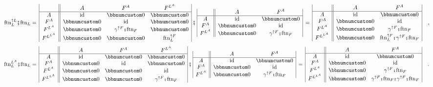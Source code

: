 \[
\negthickspace\negthickspace\negthickspace\negthickspace\text{ftn}_{L}^{\uparrow L}\bef\text{ftn}_{L}=\,\begin{array}{|c||ccc|}
 & A & F^{A} & F^{L^{A}}\\
\hline A & \text{id} & \bbnum 0 & \bbnum 0\\
F^{A} & \bbnum 0 & \text{id} & \bbnum 0\\
F^{L^{A}} & \bbnum 0 & \gamma^{\uparrow F}\bef\text{ftn}_{F} & \bbnum 0\\
F^{L^{L^{A}}} & \bbnum 0 & \bbnum 0 & \text{ftn}_{L}^{\uparrow F}
\end{array}\,\bef\,\begin{array}{|c||cc|}
 & A & F^{A}\\
\hline A & \text{id} & \bbnum 0\\
F^{A} & \bbnum 0 & \text{id}\\
F^{L^{A}} & \bbnum 0 & \gamma^{\uparrow F}\bef\text{ftn}_{F}
\end{array}\,=\,\begin{array}{|c||cc|}
 & A & F^{A}\\
\hline A & \text{id} & \bbnum 0\\
F^{A} & \bbnum 0 & \text{id}\\
F^{L^{A}} & \bbnum 0 & \gamma^{\uparrow F}\bef\text{ftn}_{F}\\
F^{L^{L^{A}}} & \bbnum 0 & \text{ftn}_{L}^{\uparrow F}\bef\gamma^{\uparrow F}\bef\text{ftn}_{F}
\end{array}\quad,
\]
\[
\negthickspace\negthickspace\negthickspace\negthickspace\text{ftn}_{L}^{L^{A}}\bef\text{ftn}_{L}=\,\begin{array}{|c||ccc|}
 & A & F^{A} & F^{L^{A}}\\
\hline A & \text{id} & \bbnum 0 & \bbnum 0\\
F^{A} & \bbnum 0 & \text{id} & \bbnum 0\\
F^{L^{A}} & \bbnum 0 & \bbnum 0 & \text{id}\\
F^{L^{L^{A}}} & \bbnum 0 & \bbnum 0 & \gamma^{\uparrow F}\bef\text{ftn}_{F}
\end{array}\,\bef\,\begin{array}{|c||cc|}
 & A & F^{A}\\
\hline A & \text{id} & \bbnum 0\\
F^{A} & \bbnum 0 & \text{id}\\
F^{L^{A}} & \bbnum 0 & \gamma^{\uparrow F}\bef\text{ftn}_{F}
\end{array}\,=\,\begin{array}{|c||cc|}
 & A & F^{A}\\
\hline A & \text{id} & \bbnum 0\\
F^{A} & \bbnum 0 & \text{id}\\
F^{L^{A}} & \bbnum 0 & \gamma^{\uparrow F}\bef\text{ftn}_{F}\\
F^{L^{L^{A}}} & \bbnum 0 & \gamma^{\uparrow F}\bef\text{ftn}_{F}\bef\gamma^{\uparrow F}\bef\text{ftn}_{F}
\end{array}\quad.
\]

